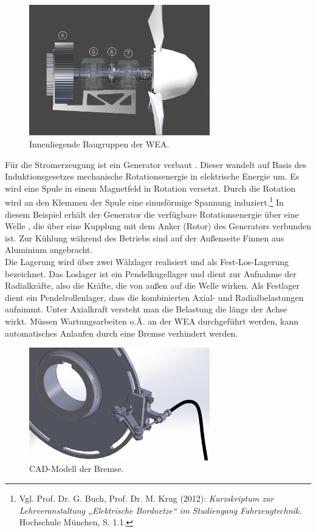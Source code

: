 \begin{figure}[H]
	\centering
	\captionsetup{width=0.7\textwidth}
	\includegraphics[keepaspectratio, width=0.7\textwidth]{bildquellen/WEA2_2}
	\caption{Innenliegende Baugruppen der WEA.}
	\label{fig:2}
\end{figure}

Für die Stromerzeugung ist ein Generator verbaut . Dieser wandelt auf Basis des Induktionsgesetzes mechanische Rotationsenergie in elektrische Energie um. Es wird eine Spule in einem Magnetfeld in Rotation versetzt. Durch die Rotation wird an den Klemmen der Spule eine sinusförmige Spannung induziert.\footnote{Vgl. Prof. Dr. G. Buch, Prof. Dr. M. Krug  (2012): \textit{Kurzskriptum zur Lehrveranstaltung „Elektrische Bordnetze“ im Studiengang Fahrzeugtechnik}. Hochschule München, S. 1.1.} In diesem Beispiel erhält der Generator die verfügbare Rotationsenergie über eine Welle , die über eine Kupplung mit dem Anker (Rotor) des Generators verbunden ist. Zur Kühlung während des Betriebs sind auf der Außenseite Finnen aus Aluminium angebracht.\\
Die Lagerung wird über zwei Wälzlager realisiert und als Fest-Los-Lagerung bezeichnet. Das Loslager ist ein Pendelkugellager  und dient zur Aufnahme der Radialkräfte, also die Kräfte, die von außen auf die Welle wirken. Als Festlager dient ein Pendelrollenlager,  dass die kombinierten Axial- und Radialbelastungen aufnimmt. Unter Axialkraft versteht man die Belastung die längs der Achse wirkt.
Müssen Wartungsarbeiten o.Ä. an der WEA durchgeführt werden, kann automatisches Anlaufen durch eine Bremse  verhindert werden. 

\begin{figure}[H]
	\centering
	\captionsetup{width=0.7\textwidth}
	\includegraphics[keepaspectratio, width=0.7\textwidth]{bildquellen/bremse}
	\caption{CAD-Modell der Bremse.}
	\label{fig:bremse}
\end{figure}

